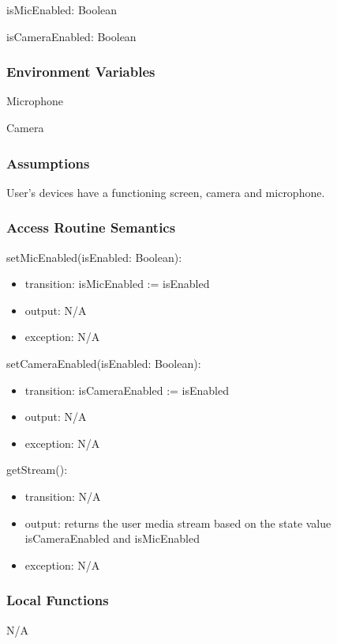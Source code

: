 \documentclass[12pt, titlepage]{article}
\begin{document}
\noindent isMicEnabled: Boolean

\noindent isCameraEnabled: Boolean

\subsubsection{Environment Variables}

\noindent Microphone

\noindent Camera

\subsubsection{Assumptions}

User's devices have a functioning screen, camera and microphone.

\subsubsection{Access Routine Semantics}

\noindent setMicEnabled(isEnabled: Boolean):
\begin{itemize}
\item transition: isMicEnabled := isEnabled
\item output: N/A
\item exception: N/A
\end{itemize}


\noindent setCameraEnabled(isEnabled: Boolean):
\begin{itemize}
\item transition: isCameraEnabled := isEnabled
\item output: N/A
\item exception: N/A
\end{itemize}


\noindent getStream():
\begin{itemize}
\item transition: N/A
\item output: returns the user media stream based on the state value
  isCameraEnabled and isMicEnabled
\item exception: N/A
\end{itemize}

\subsubsection{Local Functions}

N/A
\end{document}

